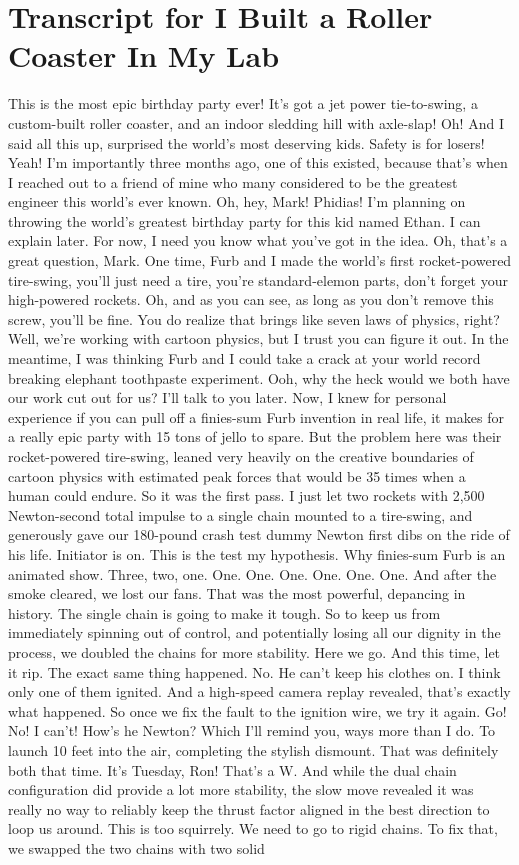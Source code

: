 \documentclass{article}
\begin{document}
\section*{Transcript for I Built a Roller Coaster In My Lab}
This is the most epic birthday party ever! It's got a jet power tie-to-swing, a custom-built roller coaster, and an indoor sledding hill with axle-slap! Oh! And I said all this up, surprised the world's most deserving kids. Safety is for losers! Yeah! I'm importantly three months ago, one of this existed, because that's when I reached out to a friend of mine who many considered to be the greatest engineer this world's ever known. Oh, hey, Mark! Phidias! I'm planning on throwing the world's greatest birthday party for this kid named Ethan. I can explain later. For now, I need you know what you've got in the idea. Oh, that's a great question, Mark. One time, Furb and I made the world's first rocket-powered tire-swing, you'll just need a tire, you're standard-elemon parts, don't forget your high-powered rockets. Oh, and as you can see, as long as you don't remove this screw, you'll be fine. You do realize that brings like seven laws of physics, right? Well, we're working with cartoon physics, but I trust you can figure it out. In the meantime, I was thinking Furb and I could take a crack at your world record breaking elephant toothpaste experiment. Ooh, why the heck would we both have our work cut out for us? I'll talk to you later. Now, I knew for personal experience if you can pull off a finies-sum Furb invention in real life, it makes for a really epic party with 15 tons of jello to spare. But the problem here was their rocket-powered tire-swing, leaned very heavily on the creative boundaries of cartoon physics with estimated peak forces that would be 35 times when a human could endure. So it was the first pass. I just let two rockets with 2,500 Newton-second total impulse to a single chain mounted to a tire-swing, and generously gave our 180-pound crash test dummy Newton first dibs on the ride of his life. Initiator is on. This is the test my hypothesis. Why finies-sum Furb is an animated show. Three, two, one. One. One. One. One. One. One. And after the smoke cleared, we lost our fans. That was the most powerful, depancing in history. The single chain is going to make it tough. So to keep us from immediately spinning out of control, and potentially losing all our dignity in the process, we doubled the chains for more stability. Here we go. And this time, let it rip. The exact same thing happened. No. He can't keep his clothes on. I think only one of them ignited. And a high-speed camera replay revealed, that's exactly what happened. So once we fix the fault to the ignition wire, we try it again. Go! No! I can't! How's he Newton? Which I'll remind you, ways more than I do. To launch 10 feet into the air, completing the stylish dismount. That was definitely both that time. It's Tuesday, Ron! That's a W. And while the dual chain configuration did provide a lot more stability, the slow move revealed it was really no way to reliably keep the thrust factor aligned in the best direction to loop us around. This is too squirrely. We need to go to rigid chains. To fix that, we swapped the two chains with two solid 
\end{document}
